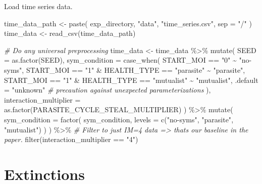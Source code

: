 \documentclass[
]{book}
\newenvironment{Shaded}{\begin{snugshade}}{\end{snugshade}}
\newcommand{\AttributeTok}[1]{\textcolor[rgb]{0.77,0.63,0.00}{#1}}
\newcommand{\CommentTok}[1]{\textcolor[rgb]{0.56,0.35,0.01}{\textit{#1}}}
\newcommand{\FunctionTok}[1]{\textcolor[rgb]{0.00,0.00,0.00}{#1}}
\newcommand{\NormalTok}[1]{#1}
\newcommand{\OtherTok}[1]{\textcolor[rgb]{0.56,0.35,0.01}{#1}}
\newcommand{\SpecialCharTok}[1]{\textcolor[rgb]{0.00,0.00,0.00}{#1}}
\newcommand{\StringTok}[1]{\textcolor[rgb]{0.31,0.60,0.02}{#1}}
\begin{document}
Load time series data.

\begin{Shaded}
\begin{Highlighting}[]
\NormalTok{time\_data\_path }\OtherTok{\textless{}{-}} \FunctionTok{paste}\NormalTok{(}
\NormalTok{  exp\_directory,}
  \StringTok{"data"}\NormalTok{,}
  \StringTok{"time\_series.csv"}\NormalTok{,}
  \AttributeTok{sep =} \StringTok{"/"}
\NormalTok{)}
\NormalTok{time\_data }\OtherTok{\textless{}{-}} \FunctionTok{read\_csv}\NormalTok{(time\_data\_path)}

\CommentTok{\# Do any universal preprocessing}
\NormalTok{time\_data }\OtherTok{\textless{}{-}}\NormalTok{ time\_data }\SpecialCharTok{\%\textgreater{}\%}
  \FunctionTok{mutate}\NormalTok{(}
    \AttributeTok{SEED =} \FunctionTok{as.factor}\NormalTok{(SEED),}
    \AttributeTok{sym\_condition =} \FunctionTok{case\_when}\NormalTok{(}
\NormalTok{      START\_MOI }\SpecialCharTok{==} \StringTok{"0"} \SpecialCharTok{\textasciitilde{}} \StringTok{"no{-}syms"}\NormalTok{,}
\NormalTok{      START\_MOI }\SpecialCharTok{==} \StringTok{"1"} \SpecialCharTok{\&}\NormalTok{ HEALTH\_TYPE }\SpecialCharTok{==} \StringTok{"parasite"} \SpecialCharTok{\textasciitilde{}} \StringTok{"parasite"}\NormalTok{,}
\NormalTok{      START\_MOI }\SpecialCharTok{==} \StringTok{"1"} \SpecialCharTok{\&}\NormalTok{ HEALTH\_TYPE }\SpecialCharTok{==} \StringTok{"mutualist"} \SpecialCharTok{\textasciitilde{}} \StringTok{"mutualist"}\NormalTok{,}
      \AttributeTok{.default =} \StringTok{"unknown"} \CommentTok{\# precaution against unexpected parameterizations}
\NormalTok{    ),}
    \AttributeTok{interaction\_multiplier =} \FunctionTok{as.factor}\NormalTok{(PARASITE\_CYCLE\_STEAL\_MULTIPLIER)}
\NormalTok{  ) }\SpecialCharTok{\%\textgreater{}\%}
  \FunctionTok{mutate}\NormalTok{(}
    \AttributeTok{sym\_condition =} \FunctionTok{factor}\NormalTok{(}
\NormalTok{      sym\_condition,}
      \AttributeTok{levels =} \FunctionTok{c}\NormalTok{(}\StringTok{"no{-}syms"}\NormalTok{, }\StringTok{"parasite"}\NormalTok{, }\StringTok{"mutualist"}\NormalTok{)}
\NormalTok{    )}
\NormalTok{  ) }\SpecialCharTok{\%\textgreater{}\%}
  \CommentTok{\# Filter to just IM=4 data =\textgreater{} that\textquotesingle{}s our baseline in the paper.}
  \FunctionTok{filter}\NormalTok{(interaction\_multiplier }\SpecialCharTok{==} \StringTok{"4"}\NormalTok{)}
\end{Highlighting}
\end{Shaded}

\hypertarget{extinctions-1}{%
\section{Extinctions}\label{extinctions-1}}
\end{document}
